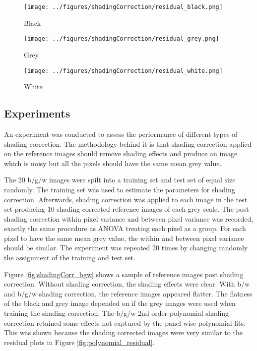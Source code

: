 \documentclass[a4paper]{proc}
\begin{document}
\begin{figure*}
	\centering
	\begin{subfigure}{0.45\textwidth}
		\centering
		\texttt{[image: ../figures/shadingCorrection/residual\_black.png]}
		\caption{Black}
	\end{subfigure}
	\begin{subfigure}{0.45\textwidth}
		\centering
		\texttt{[image: ../figures/shadingCorrection/residual\_grey.png]}
		\caption{Grey}
	\end{subfigure}
	\begin{subfigure}{0.45\textwidth}
		\centering
		\texttt{[image: ../figures/shadingCorrection/residual\_white.png]}
		\caption{White}
	\end{subfigure}
	\caption{Standardised residuals from the second order panel-wise surface polynomials fit on the reference images.}
	\label{fig:polynomial_residual}
\end{figure*}

\subsection{Experiments}

An experiment was conducted to assess the performance of different types of shading correction. The methodology behind it is that shading correction applied on the reference images should remove shading effects and produce an image which is noisy but all the pixels should have the same mean grey value.

The 20 b/g/w images were spilt into a training set and test set of equal size randomly. The training set was used to estimate the parameters for shading correction. Afterwards, shading correction was applied to each image in the test set producing 10 shading corrected reference images of each grey scale. The post shading correction within pixel variance and between pixel variance was recorded, exactly the same procedure as ANOVA treating each pixel as a group. For each pixel to have the same mean grey value, the within and between pixel variance should be similar. The experiment was repeated 20 times by changing randomly the assignment of the training and test set.

Figure \ref{fig:shadingCorr_bgw} shows a sample of reference images post shading correction. Without shading correction, the shading effects were clear. With b/w and b/g/w shading correction, the reference images appeared flatter. The flatness of the black and grey image depended on if the grey images were used when training the shading correction. The b/g/w 2nd order polynomial shading correction retained some effects not captured by the panel wise polynomial fits. This was shown because the shading corrected images were very similar to the residual plots in Figure \ref{fig:polynomial_residual}.
\end{document}
